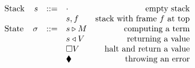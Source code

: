 \documentclass[../plutus-core-specification.tex]{subfiles}
\begin{document}
\begin{figure}[H]
\begin{subfigure}[c]{\linewidth}
    \centering
    \[\begin{array}{lrclr}
        \textrm{Stack} & s      & ::= & \cdot                             & \textrm{empty stack}\\
                       &        &     & s,f                               & \textrm{stack with frame $f$ at top}\\
        \textrm{State} & \sigma & ::= & s \triangleright M                  & \textrm{computing a term}\\
                       &        &     & s \triangleleft V                 & \textrm{returning a value}\\
                       &        &     & \square V                         & \textrm{halt and return a value}\\
                       &        &     & \blacklozenge{}                        & \textrm{throwing an error}
    \end{array}\]

    \label{fig:ck-frames}
\end{subfigure}


\begin{subfigure}[c]{\linewidth}


\end{subfigure}
\end{figure}
\end{document}
